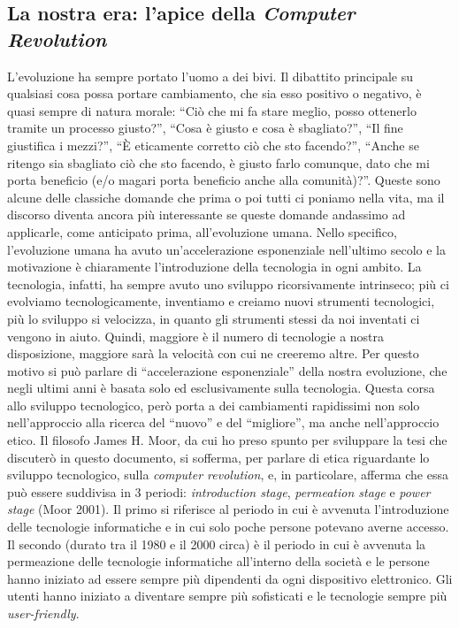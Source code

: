 \subsection*{La nostra era: l’apice della \textit{Computer Revolution}}

L’evoluzione ha sempre portato l’uomo a dei bivi. Il dibattito principale su qualsiasi cosa possa portare cambiamento, che sia esso positivo o negativo, è quasi sempre di natura morale: “Ciò che mi fa stare meglio, posso ottenerlo tramite un processo giusto?”, “Cosa è giusto e cosa è sbagliato?”, “Il fine giustifica i mezzi?”, “È eticamente corretto ciò che sto facendo?”, “Anche se ritengo sia sbagliato ciò che sto facendo, è giusto farlo comunque, dato che mi porta beneficio (e/o magari porta beneficio anche alla comunità)?”. Queste sono alcune delle classiche domande che prima o poi tutti ci poniamo nella vita, ma il discorso diventa ancora più interessante se queste domande andassimo ad applicarle, come anticipato prima, all’evoluzione umana. Nello specifico, l’evoluzione umana ha avuto un’accelerazione esponenziale nell’ultimo secolo e la motivazione è chiaramente l’introduzione della tecnologia in ogni ambito. La tecnologia, infatti, ha sempre avuto uno sviluppo ricorsivamente intrinseco; più ci evolviamo tecnologicamente, inventiamo e creiamo nuovi strumenti tecnologici, più lo sviluppo si velocizza, in quanto gli strumenti stessi da noi inventati ci vengono in aiuto. Quindi, maggiore è il numero di tecnologie a nostra disposizione, maggiore sarà la velocità con cui ne creeremo altre. Per questo motivo si può parlare di “accelerazione esponenziale” della nostra evoluzione, che negli ultimi anni è basata solo ed esclusivamente sulla tecnologia.
Questa corsa allo sviluppo tecnologico, però porta a dei cambiamenti rapidissimi non solo nell’approccio alla ricerca del “nuovo” e del “migliore”, ma anche nell’approccio etico.
Il filosofo James H. Moor, da cui ho preso spunto per sviluppare la tesi che discuterò in questo documento, si sofferma, per parlare di etica riguardante lo sviluppo tecnologico, sulla \textit{computer revolution}, e, in particolare, afferma che essa può essere suddivisa in 3 periodi: \textit{introduction stage}, \textit{permeation stage} e \textit{power stage} (Moor 2001). 
Il primo si riferisce al periodo in cui è avvenuta l’introduzione delle tecnologie informatiche e in cui solo poche persone potevano averne accesso. 
Il secondo (durato tra il 1980 e il 2000 circa) è il periodo in cui è avvenuta la permeazione delle tecnologie informatiche all’interno della società e le persone hanno iniziato ad essere sempre più dipendenti da ogni dispositivo elettronico. Gli utenti hanno iniziato a diventare sempre più sofisticati e le tecnologie sempre più \textit{user-friendly}. 
